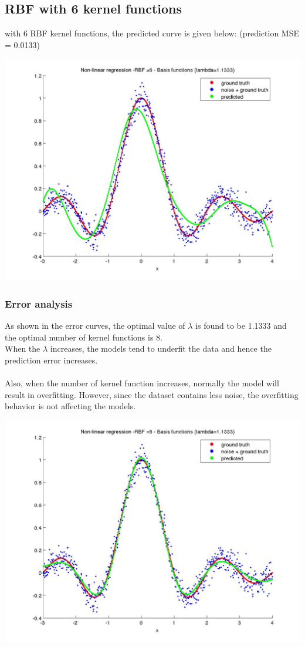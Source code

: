 \documentclass[fleqn]{article}
\begin{document}
\subsection{RBF with 6 kernel functions}
with 6 RBF kernel functions, the predicted curve is given below: (prediction MSE = 0.0133)

\includegraphics[scale=0.3]{./pics/task4/RBF =6 - Basis functions (lambda=1.1333)_train.jpg}

\subsubsection{Error analysis}

As shown in the error curves, the optimal value of $\lambda$ is found to be 1.1333 and the optimal number of kernel functions is 8.\\
When the $\lambda$ increases, the models tend to underfit the data and hence the prediction error increases.\\\\
Also, when the number of kernel function increases, normally the model will result in overfitting. However, since the dataset contains less noise, the overfitting behavior is not affecting the models.

\includegraphics[scale=0.3]{./pics/task4/RBF =8 - Basis functions (lambda=1.1333)_train.jpg}
\end{document}
